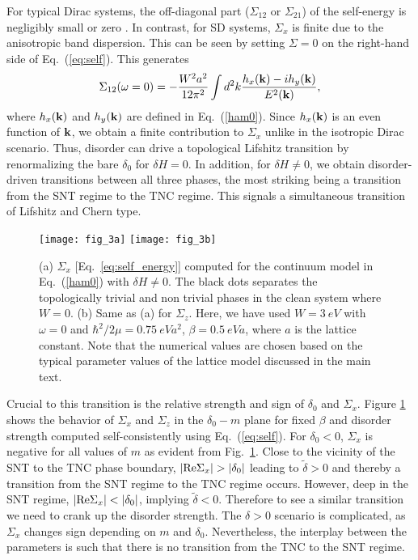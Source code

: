 \documentclass[aps,prb,showpacs,twocolumn,floats]{revtex4-1}
\begin{document}
For typical Dirac systems, the off-diagonal part ($\Sigma_{12}$ or $\Sigma_{21}$) of the self-energy is negligibly small or zero \cite{benakker,paraj,song}. In contrast, for SD systems, $\Sigma_x$ is finite due to the anisotropic band dispersion. This can be seen by setting  $\Sigma=0$ on the right-hand side of Eq.~(\ref{eq:self}). This generates 
\begin{align}
\Sigma_{12} (\omega = 0)=-\frac{W^2a^2}{12\pi^2}\int d^2k \frac{h_x({\bf k})-i  h_y({\bf k})}{E^2({\bf{k}}) },
\label{eq:sigx}
\end{align} 
where $h_x({\bf k})$ and $h_y({\bf k})$ are defined in Eq.~(\ref{ham0}). Since $h_{x}({\bf k} )$ is an even function of ${\bf k}$, we obtain a finite
contribution to $\Sigma_x$ unlike in the isotropic Dirac scenario. Thus, disorder can  drive a topological Lifshitz  transition by renormalizing the bare $\delta_0$ for $\delta H=0$. 
In addition, for $\delta H\ne 0$, we obtain disorder-driven transitions between all three phases, the most striking being a transition from the SNT regime to the TNC regime. This signals a simultaneous transition of Lifshitz and Chern type. 

\begin{figure}
\texttt{[image: fig\_3a]}
\texttt{[image: fig\_3b]}
\caption{(a) $\Sigma_x$ [Eq.~\ref{eq:self_energy}] computed for the continuum model in Eq.~(\ref{ham0}) with $\delta H\ne0$. The black dots separates the topologically trivial and non trivial phases in the clean system where $W = 0$. (b) Same as (a) for $\Sigma_z$.  Here, we have used $W = 3~eV$ with $\omega = 0$ and $\hbar^2/2\mu=0.75~ eV a^2$, $\beta=0.5~eV a$, where $a$ is the lattice constant. Note that the numerical values are chosen based on the typical parameter values of the lattice model discussed in the main text.}
\label{fig:renorm}
\end{figure}
Crucial to this transition is the relative strength and sign of $\delta_0$ and $\Sigma_x$. Figure {\ref{fig:renorm}} shows the behavior of $\Sigma_x$ and $\Sigma_z$ in the $\delta_0-m$ plane for fixed $\beta$ and disorder strength computed self-consistently using Eq.~(\ref{eq:self}). For $\delta_0<0$, $\Sigma_x$ is negative for all values  of $m$ as evident from Fig.~{\ref{fig:renorm}}. Close to the vicinity of the SNT to the TNC phase boundary, $|{\rm Re} \Sigma_x|> |\delta_0|$ leading to $\tilde \delta>0$ and thereby a transition from the SNT regime to the TNC regime occurs. However, deep in the SNT regime, $|{\rm Re} \Sigma_x|< |\delta_0|$, implying $\tilde \delta < 0$. Therefore to see a similar transition we need to crank up the disorder strength. The $\delta>0$ scenario is complicated, as $\Sigma_x$ changes sign depending on $m$ and $\delta_0$. Nevertheless, the interplay between the parameters is such that there is no transition from the TNC to the SNT regime.
\end{document}
